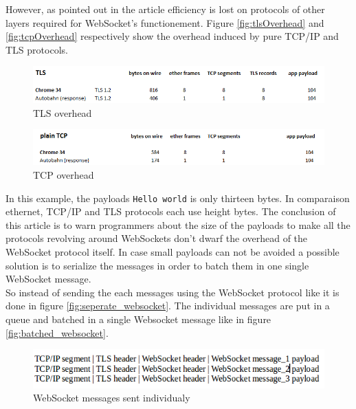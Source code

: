 However, as pointed out in the article efficiency is lost on protocols of other layers
required for WebSocket's functionement. Figure \ref{fig:tlsOverhead} and
\ref{fig:tcpOverhead} respectively show the overhead induced by pure TCP/IP and
TLS protocols.\\

\begin{figure}[H]
\centering
\includegraphics[width=\textwidth]{./Figures/tls_overhead.png}
\caption[TLS overhead]{TLS overhead \citep{Reference30}}
\label{fig:tls_overhead}
\end{figure}

\begin{figure}[H]
\centering
\includegraphics[width=\textwidth]{./Figures/tcp_overhead.png}
\caption[TCP overhead]{TCP overhead \citep{Reference30}}
\label{fig:tcp_overhead}
\end{figure}



In this example, the payloads \texttt{Hello world} is only thirteen bytes. In
comparaison ethernet, TCP/IP and TLS protocols each use height bytes. The
conclusion of this article is to warn programmers about the size of the
payloads to make all the protocols revolving around WebSockets don't dwarf the
overhead of the WebSocket protocol itself. In case small payloads can not be
avoided a possible solution is to serialize the messages in order to batch them
in one single WebSocket message.\\

So instead of sending the each messages using the WebSocket protocol like it is
done in figure \ref{fig:seperate_websocket}. The individual messages are put in
a queue and batched in a single Websocket message like in figure
\ref{fig:batched_websocket}.\\


\begin{figure}[H]
\centering
\includegraphics[width=\textwidth]{./Figures/separate_websocket.png}
\caption[Websocket messages sent individualy]{WebSocket messages sent individualy \citep{Reference30}}
\label{fig:separate_websocket}
\end{figure}

